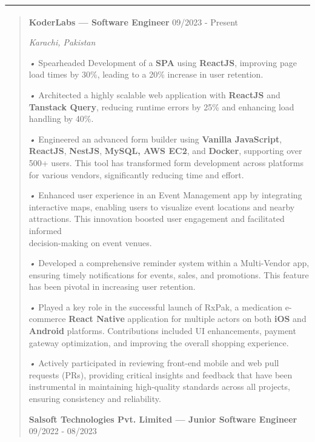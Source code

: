 \documentclass[
]{article}
\begin{document}
\includegraphics[width=7.5in,height=\textheight]{vertopal_6d2e6bfb3b634523a1faf107b161d186/media/image1.png}

\begin{quote}
\textbf{KoderLabs --- Software Engineer} 09/2023 - Present

\emph{Karachi, Pakistan}

\emph{•} Spearheaded Development of a \textbf{SPA} using
\textbf{ReactJS}, improving page load times by 30\%, leading to a 20\%
increase in user retention.

\emph{•} Architected a highly scalable web application with
\textbf{ReactJS} and \textbf{Tanstack Query}, reducing runtime errors by
25\% and enhancing load handling by 40\%.

\emph{•} Engineered an advanced form builder using \textbf{Vanilla
JavaScript}, \textbf{ReactJS}, \textbf{NestJS}, \textbf{MySQL, AWS EC2},
and \textbf{Docker}, supporting over 500+ users. This tool has
transformed form development across platforms for various vendors,
significantly reducing time and effort.

\emph{•} Enhanced user experience in an Event Management app by
integrating interactive maps, enabling users to visualize event
locations and nearby attractions. This innovation boosted user
engagement and facilitated informed\\
decision-making on event venues.

\emph{•} Developed a comprehensive reminder system within a Multi-Vendor
app, ensuring timely notifications for events, sales, and promotions.
This feature has been pivotal in increasing user retention.

\emph{•} Played a key role in the successful launch of RxPak, a
medication e-commerce \textbf{React Native} application for multiple
actors on both \textbf{iOS} and \textbf{Android} platforms.
Contributions included UI enhancements, payment gateway optimization,
and improving the overall shopping experience.

\emph{•} Actively participated in reviewing front-end mobile and web
pull requests (PRs), providing critical insights and feedback that have
been instrumental in maintaining high-quality standards across all
projects, ensuring consistency and reliability.

\textbf{Salsoft Technologies Pvt. Limited --- Junior Software Engineer}
09/2022 - 08/2023


\end{quote}
\end{document}
